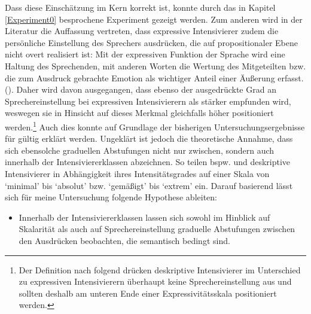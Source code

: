 \noindent Dass diese Einschätzung im Kern korrekt ist, konnte durch das in {Kapitel \ref{Experiment0}} besprochene Experiment gezeigt werden. Zum anderen wird in der Literatur die Auffassung vertreten, dass expressive Intensivierer zudem die persönliche Einstellung des Sprechers ausdrücken, die auf propositionaler Ebene nicht overt realisiert ist: \glqq{}Mit der expressiven \textelp{} Funktion der Sprache wird eine Haltung des Sprechenden, mit anderen Worten die Wertung des Mitgeteilten bzw. die zum Ausdruck gebrachte Emotion als wichtiger Anteil einer Äußerung erfasst.\grqq{} (\citealt[57]{Ortner.2014}). Daher wird davon ausgegangen, dass ebenso der ausgedrückte Grad an Sprechereinstellung bei expressiven Intensivierern als stärker empfunden wird, weswegen sie in Hinsicht auf dieses Merkmal gleichfalls höher positioniert werden.\footnote{Der Definition nach \citet[133]{Gutzmann.2019a} folgend drücken deskriptive Intensivierer im Unterschied zu expressiven Intensivierern überhaupt keine Sprechereinstellung aus und sollten deshalb am unteren Ende einer Expressivitätsskala {positioniert werden}.} Auch dies konnte auf Grundlage der bisherigen Untersuchungsergebnisse für gültig erklärt werden. Ungeklärt ist jedoch die theoretische Annahme, dass sich ebensolche graduellen Abstufungen nicht nur zwischen, sondern auch innerhalb der Intensiviererklassen abzeichnen. So teilen bspw. {\citet[]{Biedermann.1969}} und {\citet[]{Breindl.2007}} deskriptive Intensivierer in Abhängigkeit ihres Intensitätsgrades auf einer Skala von `minimal' bis `absolut' \citep[vgl.][87]{Biedermann.1969} bzw. `gemäßigt' bis `extrem' {\citep[vgl.][408]{Breindl.2007}} ein. Darauf basierend lässt sich für meine Untersuchung folgende {Hypothese ableiten}:

\begin{itemize}
\item[\textbf{\textsc{H6}}] Innerhalb der Intensiviererklassen lassen sich sowohl im Hinblick auf Skalarität als auch auf Sprechereinstellung graduelle Abstufungen zwischen den Ausdrücken beobachten, die semantisch bedingt sind.
\end{itemize}

